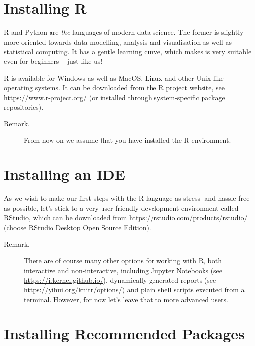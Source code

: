 \documentclass[10pt,b5paper,krantz1]{krantz}
\begin{document}
\hypertarget{installing-r}{%
\section{Installing R}\label{installing-r}}

R and Python are \emph{the} languages of modern data science.
The former is slightly more oriented towards data modelling,
analysis and visualisation as well as statistical computing.
It has a gentle learning curve, which makes is very suitable even
for beginners -- just like us!

R is available for Windows as well as MacOS, Linux and other Unix-like
operating systems.
It can be downloaded from the R project website,
see \url{https://www.r-project.org/} (or installed through system-specific package
repositories).

\begin{description}
\item[Remark.]
From now on we assume that you have installed the R environment.
\end{description}

\hypertarget{installing-an-ide}{%
\section{Installing an IDE}\label{installing-an-ide}}

As we wish to make our first steps with the R language
as stress- and hassle-free as possible, let's stick to a very user-friendly
development environment called RStudio, which can be downloaded from
\url{https://rstudio.com/products/rstudio/} (choose RStudio Desktop Open Source Edition).

\begin{description}
\item[Remark.]
There are of course many other options for working with R, both interactive
and non-interactive, including Jupyter Notebooks (see \url{https://irkernel.github.io/}),
dynamically generated reports (see \url{https://yihui.org/knitr/options/})
and plain shell scripts executed from a terminal.
However, for now let's leave that to more
advanced users.
\end{description}

\hypertarget{installing-recommended-packages}{%
\section{Installing Recommended Packages}\label{installing-recommended-packages}}
\end{document}

